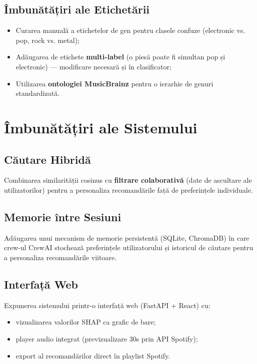 \documentclass[12pt,a4paper]{report}
\begin{document}
\subsection{Îmbunătățiri ale Etichetării}

\begin{itemize}[noitemsep]
    \item Curarea manuală a etichetelor de gen pentru clasele confuze
          (electronic vs. pop, rock vs. metal);
    \item Adăugarea de etichete \textbf{multi-label} (o piesă poate fi simultan
          pop și electronic) — modificare necesară și în clasificator;
    \item Utilizarea \textbf{ontologiei MusicBrainz} pentru o ierarhie de genuri
          standardizată.
\end{itemize}

\section{Îmbunătățiri ale Sistemului}

\subsection{Căutare Hibridă}

Combinarea similarității cosinus cu \textbf{filtrare colaborativă} (date de
ascultare ale utilizatorilor) pentru a personaliza recomandările față de
preferințele individuale.

\subsection{Memorie între Sesiuni}

Adăugarea unui mecanism de memorie persistentă (SQLite, ChromaDB) în care
crew-ul CrewAI stochează preferințele utilizatorului și istoricul de căutare
pentru a personaliza recomandările viitoare.

\subsection{Interfață Web}

Expunerea sistemului printr-o interfață web (FastAPI + React) cu:
\begin{itemize}[noitemsep]
    \item vizualizarea valorilor SHAP ca grafic de bare;
    \item player audio integrat (previzualizare 30s prin API Spotify);
    \item export al recomandărilor direct în playlist Spotify.
\end{itemize}
\end{document}
